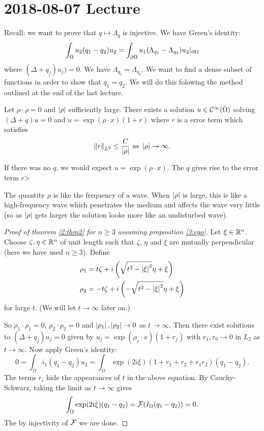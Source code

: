 \section{2018-08-07 Lecture}

Recall: we want to prove that $q \mapsto \Lambda_q$ is injective.
We have Green's identity:
\[ \int_\Omega u_2(q_1-q_2)u_2 = \int_{\partial\Omega} u_1(\Lambda_{q_1}-\Lambda_{q_2})u_2\vert_{\partial\Omega} \]
where $(\Delta+q_j)u_j)=0$.
We have $\Lambda_{q_1}=\Lambda_{q_2}$.
We want to find a dense subset of functions in order to show that $q_1=q_2$.
We will do this folowing the method outlined at the end of the last lecture.

\begin{prop}\label{3:cgo}
  Let $\rho\cdot\rho=0$ and $\left\lvert \rho \right\rvert$ sufficiently large.  
  There exists a solution $u \in \mathcal{C}^\infty(\bar\Omega)$ solving $(\Delta+q)u=0$ and $u=\exp(\rho\cdot x)(1+r)$ where $r$ is a error term which satisfies
  \[ \left\lVert r \right\rVert_{L^2} \leq \frac{C}{\left\lvert \rho \right\rvert} \text{ as } \left\lvert \rho \right\rvert \to \infty. \]
\end{prop}

\begin{rmk}
  If there was no $q$, we would expect $u=\exp(\rho\cdot x)$.
  The $q$ gives rise to the error term $r$>
\end{rmk}

\begin{rmk}
  The quantity $\rho$ is like the frequency of a wave.
  When $\left\lvert \rho \right\rvert$ is large, this is like a high-frequency wave which penetrates the medium and affects the wave very little (so as $\left\lvert \rho \right\rvert$ gets larger the solution looks more like an undisturbed wave).
\end{rmk}

\begin{proof}[Proof of theorem \ref{2:thm2} for $n \geq 3$ assuming proposition \ref{3:cgo}]
  Let $\xi \in \mathbb{R}^n$.
  Choose $\zeta, \eta \in \mathbb{R}^n$ of unit length such that $\zeta$, $\eta$ and $\xi$ are mutually perpendicular (here we have used $n \geq 3$).
  Define
  \begin{align*}
    \rho_1 &= t\zeta + i\left( \sqrt{t^2-\left\lvert \xi \right\rvert^2} \eta + \xi \right) \\
    \rho_2 &= -t\zeta + i\left( -\sqrt{t^2-\left\lvert \xi \right\rvert^2} \eta + \xi \right)
  \end{align*}
  for large $t$.
  (We will let $t \to \infty$ later on.)

  So $\rho_1 \cdot \rho_1 = 0$, $\rho_2 \cdot \rho_2 = 0$ and $\left\lvert \rho_1 \right\rvert, \left\lvert \rho_2 \right\rvert \to 0$ as $t \to \infty$.
  Then there exist solutions to $(\Delta+q_j)u_j=0$ given by $u_j=\exp(\rho_j\cdot x)(1+r_j)$ with $r_1,r_0 \to 0$ in $L_2$ as $t \to \infty$.
  Now apply Green's identity:
  \[ 0 = \int_\Omega i_1(q_1-q_2)u_2 = \int_\Omega \exp(2i\xi)(1+r_1+r_2+r_1r_2)(q_1-q_2). \]
  The terms $r_i$ hide the appearances of $t$ in the above equation.
  By Cauchy-Schwarz, taking the limit as $t \to \infty$ gives
  \[ \int_\Omega \exp(2i\xi)(q_1-q_2) = \mathcal{F}(I_\Omega(q_1-q_2)) = 0. \]
  The by injectivity of $\mathcal{F}$ we are done.
\end{proof}

